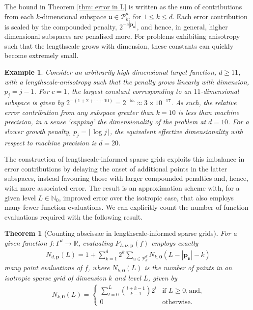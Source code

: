 \documentclass[pdflatex,sn-mathphys-num]{sn-jnl}%
\theoremstyle{thmstyleone}%
\newtheorem{theorem}{Theorem}%
\theoremstyle{thmstyletwo}%
\newtheorem{example}{Example}%
\theoremstyle{thmstylethree}%
\begin{document}
The bound in Theorem \ref{thm: error in L} is written as the sum of contributions from each \(k\)-dimensional subspace \(\mathfrak{u}\in\mathcal{P}^d_k\), for \(1\leq k\leq d\). Each error contribution is scaled by the compounded penalty, \(2^{-c|\mathbf{p}_{\mathfrak{u}}|}\), and hence, in general, higher dimensional subspaces are penalised more. For problems exhibiting anisotropy such that the lengthscale grows with dimension, these constants can quickly become extremely small.
\begin{example}
    Consider an arbitrarily high dimensional target function, \(d\geq11\), with a lengthscale-anisotropy such that the penalty grows linearly with dimension, \(p_j=j-1\). For \(c=1\), the \textit{largest} constant corresponding to an \(11\)-dimensional subspace is given by \(2^{-(1+2+\cdots+10)}=2^{-55}\approx 3\times10^{-17}\). As such, the relative error contribution from any subspace greater than \(k=10\) is less than machine precision, in a sense `capping' the dimensionality of the problem at \(d=10\). For a slower growth penalty, \(p_j = \lceil\log j\rceil\), the equivalent effective dimensionality with respect to machine precision is \(d=20\).
\end{example}
The construction of lengthscale-informed sparse grids exploits this imbalance in error contributions by delaying the onset of additional points in the latter subspaces, instead favouring those with larger compounded penalties and, hence, with more associated error. The result is an approximation scheme with, for a given level \(L\in\mathbb{N}_0\), improved error over the isotropic case, that also employs many fewer function evaluations. We can explicitly count the number of function evaluations required with the following result.
\begin{theorem}[Counting abscissae in lengthscale-informed sparse grids]\label{thm: counting abscissae}
For a given function \(f:\Gamma^d\rightarrow\mathbb{R}\), evaluating \(P_{L,\boldsymbol{\nu},\mathbf{p}}(f)\) employs exactly
\begin{align}
    N_{d,\mathbf{p}}(L)=1+\sum_{k=1}^d2^k\sum_{\mathfrak{u}\in\mathcal{P}^d_k}N_{k,\mathbf{0}}(L-|\mathbf{p}_{\mathfrak{u}}|-k)\nonumber
\end{align}
many point evaluations of \(f\), where \(N_{k,\mathbf{0}}(L)\) is the number of points in an isotropic sparse grid of dimension \(k\) and level \(L\), given by
\begin{align}
    N_{k,\mathbf{0}}(L)=\begin{cases}
        \sum_{l=0}^{L}\binom{l+k-1}{k-1}2^l&\textrm{if }L\geq0, \textrm{and,}\\
        0&\textrm{otherwise.}
    \end{cases}\nonumber
\end{align}
\end{theorem}
\end{document}
